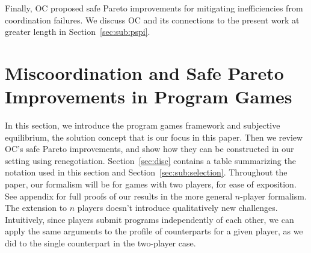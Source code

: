 \documentclass[sigconf]{aamas}
\theoremstyle{definition}
\begin{document}
Finally, OC proposed safe Pareto improvements
for mitigating inefficiencies from coordination failures.
We
discuss
OC
and its connections to the present work
at greater length
in Section~\ref{sec:sub:pspi}.

 
\section{Miscoordination and Safe Pareto Improvements
in Program Games} 

In this section, we introduce
the program games framework and subjective
equilibrium, the solution concept that is
our focus in this paper. Then we review 
OC's
safe Pareto improvements, and show how they
can be constructed in our setting using 
renegotiation.
Section~\ref{sec:disc}
contains a table summarizing
the notation used in this section and Section~\ref{sec:sub:selection}. Throughout the paper, our formalism will be for games with two players, for ease of exposition.
See appendix for
full proofs of our results in
the more general ${n}$-player
formalism.
The extension to ${n}$ players doesn’t introduce qualitatively new challenges. 
Intuitively, since players submit programs independently of each other, we
can apply the same arguments to the profile of counterparts for a given player, as we did to the single counterpart
in the two-player case.
\end{document}

